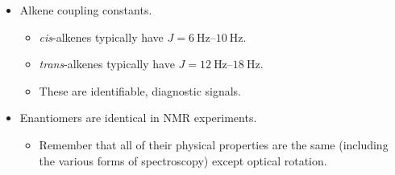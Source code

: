 \documentclass[../notes.tex]{subfiles}
\begin{document}
\begin{itemize}
\begin{figure}[h!]
\begin{subfigure}[b]{0.2\linewidth}
            \caption{}
            \label{fig:benzeneH1NMRd}
        \end{subfigure}
        \caption{Benzenes in  NMR spectroscopy.}
        \label{fig:benzeneH1NMR}
    \end{figure}
    \begin{itemize}
        \item We can predict a bunch of splitting and peaks, but often there is so much overlap that we more just get a jagged blob (see Figures \ref{fig:benzeneH1NMRa} and \ref{fig:benzeneH1NMRb}).
        \item If you can find a clear singlet, perhaps separated a bit from the rest, integration can tell you how many substituents you have (see Figure \ref{fig:benzeneH1NMRc}).
        \item The pattern in Figure \ref{fig:benzeneH1NMRd} is a dead giveaway for para substituents.
    \end{itemize}
    \item Alkene coupling constants.
    \begin{itemize}
        \item \emph{cis}-alkenes typically have $J=\SIrange{6}{10}{\hertz}$.
        \item \emph{trans}-alkenes typically have $J=\SIrange{12}{18}{\hertz}$.
        \item These are identifiable, diagnostic signals.
    \end{itemize}
    \item Enantiomers are identical in NMR experiments.
    \begin{itemize}
        \item Remember that all of their physical properties are the same (including the various forms of spectroscopy) except optical rotation.
    \end{itemize}
\end{itemize}
\end{document}
